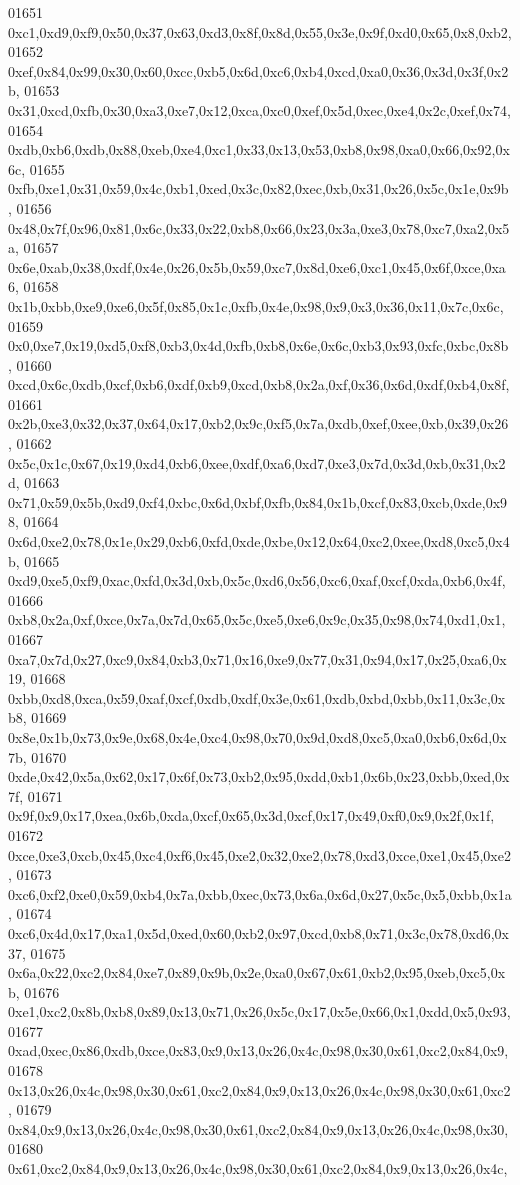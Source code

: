 \begin{DoxyCode}
01651   0xc1,0xd9,0xf9,0x50,0x37,0x63,0xd3,0x8f,0x8d,0x55,0x3e,0x9f,0xd0,0x65,0x8,0xb2,
01652   0xef,0x84,0x99,0x30,0x60,0xcc,0xb5,0x6d,0xc6,0xb4,0xcd,0xa0,0x36,0x3d,0x3f,0x2b,
01653   0x31,0xcd,0xfb,0x30,0xa3,0xe7,0x12,0xca,0xc0,0xef,0x5d,0xec,0xe4,0x2c,0xef,0x74,
01654   0xdb,0xb6,0xdb,0x88,0xeb,0xe4,0xc1,0x33,0x13,0x53,0xb8,0x98,0xa0,0x66,0x92,0x6c,
01655   0xfb,0xe1,0x31,0x59,0x4c,0xb1,0xed,0x3c,0x82,0xec,0xb,0x31,0x26,0x5c,0x1e,0x9b,
01656   0x48,0x7f,0x96,0x81,0x6c,0x33,0x22,0xb8,0x66,0x23,0x3a,0xe3,0x78,0xc7,0xa2,0x5a,
01657   0x6e,0xab,0x38,0xdf,0x4e,0x26,0x5b,0x59,0xc7,0x8d,0xe6,0xc1,0x45,0x6f,0xce,0xa6,
01658   0x1b,0xbb,0xe9,0xe6,0x5f,0x85,0x1c,0xfb,0x4e,0x98,0x9,0x3,0x36,0x11,0x7c,0x6c,
01659   0x0,0xe7,0x19,0xd5,0xf8,0xb3,0x4d,0xfb,0xb8,0x6e,0x6c,0xb3,0x93,0xfc,0xbc,0x8b,
01660   0xcd,0x6c,0xdb,0xcf,0xb6,0xdf,0xb9,0xcd,0xb8,0x2a,0xf,0x36,0x6d,0xdf,0xb4,0x8f,
01661   0x2b,0xe3,0x32,0x37,0x64,0x17,0xb2,0x9c,0xf5,0x7a,0xdb,0xef,0xee,0xb,0x39,0x26,
01662   0x5c,0x1c,0x67,0x19,0xd4,0xb6,0xee,0xdf,0xa6,0xd7,0xe3,0x7d,0x3d,0xb,0x31,0x2d,
01663   0x71,0x59,0x5b,0xd9,0xf4,0xbc,0x6d,0xbf,0xfb,0x84,0x1b,0xcf,0x83,0xcb,0xde,0x98,
01664   0x6d,0xe2,0x78,0x1e,0x29,0xb6,0xfd,0xde,0xbe,0x12,0x64,0xc2,0xee,0xd8,0xc5,0x4b,
01665   0xd9,0xe5,0xf9,0xac,0xfd,0x3d,0xb,0x5c,0xd6,0x56,0xc6,0xaf,0xcf,0xda,0xb6,0x4f,
01666   0xb8,0x2a,0xf,0xce,0x7a,0x7d,0x65,0x5c,0xe5,0xe6,0x9c,0x35,0x98,0x74,0xd1,0x1,
01667   0xa7,0x7d,0x27,0xc9,0x84,0xb3,0x71,0x16,0xe9,0x77,0x31,0x94,0x17,0x25,0xa6,0x19,
01668   0xbb,0xd8,0xca,0x59,0xaf,0xcf,0xdb,0xdf,0x3e,0x61,0xdb,0xbd,0xbb,0x11,0x3c,0xb8,
01669   0x8e,0x1b,0x73,0x9e,0x68,0x4e,0xc4,0x98,0x70,0x9d,0xd8,0xc5,0xa0,0xb6,0x6d,0x7b,
01670   0xde,0x42,0x5a,0x62,0x17,0x6f,0x73,0xb2,0x95,0xdd,0xb1,0x6b,0x23,0xbb,0xed,0x7f,
01671   0x9f,0x9,0x17,0xea,0x6b,0xda,0xcf,0x65,0x3d,0xcf,0x17,0x49,0xf0,0x9,0x2f,0x1f,
01672   0xce,0xe3,0xcb,0x45,0xc4,0xf6,0x45,0xe2,0x32,0xe2,0x78,0xd3,0xce,0xe1,0x45,0xe2,
01673   0xc6,0xf2,0xe0,0x59,0xb4,0x7a,0xbb,0xec,0x73,0x6a,0x6d,0x27,0x5c,0x5,0xbb,0x1a,
01674   0xc6,0x4d,0x17,0xa1,0x5d,0xed,0x60,0xb2,0x97,0xcd,0xb8,0x71,0x3c,0x78,0xd6,0x37,
01675   0x6a,0x22,0xc2,0x84,0xe7,0x89,0x9b,0x2e,0xa0,0x67,0x61,0xb2,0x95,0xeb,0xc5,0xb,
01676   0xe1,0xc2,0x8b,0xb8,0x89,0x13,0x71,0x26,0x5c,0x17,0x5e,0x66,0x1,0xdd,0x5,0x93,
01677   0xad,0xec,0x86,0xdb,0xce,0x83,0x9,0x13,0x26,0x4c,0x98,0x30,0x61,0xc2,0x84,0x9,
01678   0x13,0x26,0x4c,0x98,0x30,0x61,0xc2,0x84,0x9,0x13,0x26,0x4c,0x98,0x30,0x61,0xc2,
01679   0x84,0x9,0x13,0x26,0x4c,0x98,0x30,0x61,0xc2,0x84,0x9,0x13,0x26,0x4c,0x98,0x30,
01680   0x61,0xc2,0x84,0x9,0x13,0x26,0x4c,0x98,0x30,0x61,0xc2,0x84,0x9,0x13,0x26,0x4c,

\end{DoxyCode}
